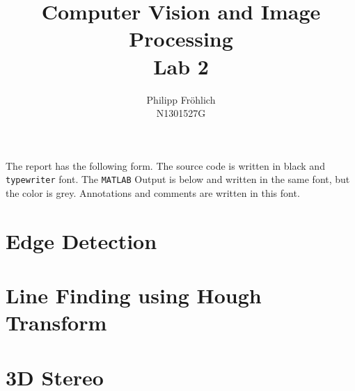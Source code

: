 \documentclass[12pt,a4paper]{scrartcl}
\author{Philipp Fröhlich\\ N1301527G}
\title{Computer Vision and Image Processing\\ Lab 2}
\begin{document}
\maketitle
\thispagestyle{empty}

The report has the following form. The source code is written in black and \texttt{typewriter} font. The \texttt{MATLAB} Output is below and written in the same font, but the color is {\color{lightgray} grey}. Annotations and comments are written in this font.
\tableofcontents
\newpage

\section{Edge Detection}

\newpage

\section{Line Finding using Hough Transform}

\newpage

\section{3D Stereo}
\end{document}

